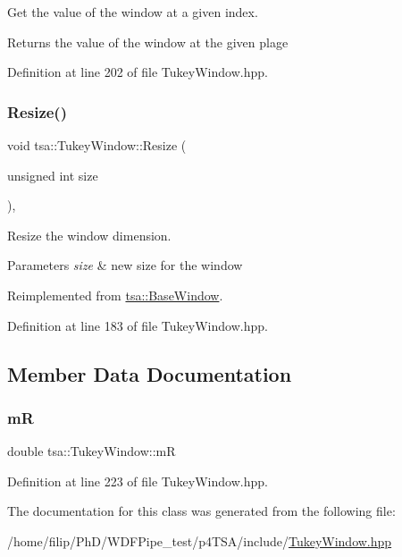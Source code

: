 Get the value of the window at a given index.

\begin{DoxyReturn}{Returns}
the value of the window at the given plage 
\end{DoxyReturn}


Definition at line 202 of file Tukey\+Window.\+hpp.

\mbox{\label{classtsa_1_1_tukey_window_acfb62239e47e5faa44210407c7c7f42f}} 
\subsubsection{\texorpdfstring{Resize()}{Resize()}}
{\footnotesize\ttfamily void tsa\+::\+Tukey\+Window\+::\+Resize (\begin{DoxyParamCaption}\item[{unsigned int}]{size }\end{DoxyParamCaption})\hspace{0.3cm}{\ttfamily [inline]}, {\ttfamily [virtual]}}

Resize the window dimension.


\begin{DoxyParams}{Parameters}
{\em size} & new size for the window \\
\hline
\end{DoxyParams}


Reimplemented from \hyperlink{classtsa_1_1_base_window_a8a2a3425f2915762d50fa57dd0e04f22}{tsa\+::\+Base\+Window}.



Definition at line 183 of file Tukey\+Window.\+hpp.



\subsection{Member Data Documentation}
\mbox{\label{classtsa_1_1_tukey_window_a351edf4bf44bbbda5a7fc6dd629837a2}} 
\subsubsection{\texorpdfstring{mR}{mR}}
{\footnotesize\ttfamily double tsa\+::\+Tukey\+Window\+::mR\hspace{0.3cm}{\ttfamily [private]}}



Definition at line 223 of file Tukey\+Window.\+hpp.



The documentation for this class was generated from the following file\+:\begin{DoxyCompactItemize}
\item 
/home/filip/\+Ph\+D/\+W\+D\+F\+Pipe\+\_\+test/p4\+T\+S\+A/include/\hyperlink{_tukey_window_8hpp}{Tukey\+Window.\+hpp}\end{DoxyCompactItemize}
